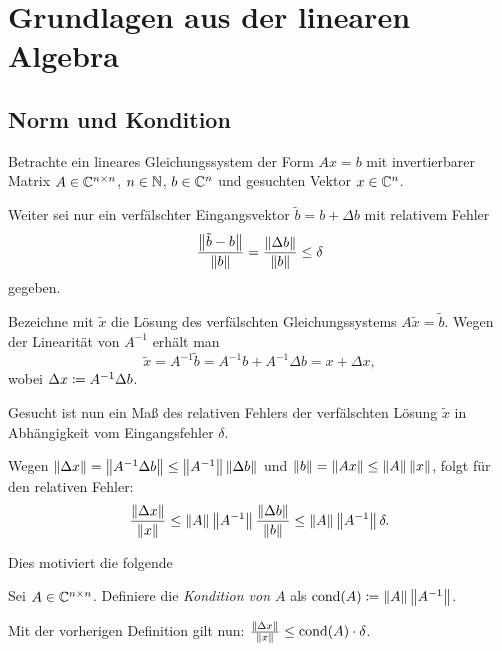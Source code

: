 \chapter{Grundlagen aus der linearen Algebra}
\section{Norm und Kondition}
Betrachte ein lineares Gleichungssystem der Form
$Ax = b$ mit invertierbarer Matrix
$A \in \mathbb{C}^{n \times n}$, $n \in \mathbb{N}$, $b \in \mathbb{C}^n$
und gesuchten Vektor $x \in \mathbb{C}^n$.

Weiter sei nur ein verfälschter Eingangsvektor $\tilde{b} = b + \Delta b$
mit relativem Fehler
\[
    \frac{\left\lVert \tilde{b} - b \right\rVert}{\left\lVert b \right\rVert} = \frac{\left\lVert \Delta b \right\rVert}{\left\lVert b \right\rVert} \leq \delta
\]
gegeben.

Bezeichne mit $\tilde{x}$ die Lösung des verfälschten Gleichungssystems
$A \tilde{x} = \tilde{b}$.
Wegen der Linearität von $A^{-1}$ erhält man
\[
    \tilde{x} = A^{-1} \tilde{b} = A^{-1} b + A^{-1} \Delta b = x + \Delta x,
\]
wobei $\Delta x \coloneqq A^{-1} \Delta b$.

Gesucht ist nun ein Maß des relativen Fehlers der verfälschten Lösung
$\tilde{x}$ in Abhängigkeit vom Eingangsfehler $\delta$.

Wegen $ \left\lVert \Delta x \right\rVert = \left\lVert A^{-1} \Delta b \right\rVert \leq \left\lVert A^{-1} \right\rVert \left\lVert \Delta b \right\rVert $
und $ \left\lVert b \right\rVert = \left\lVert A x \right\rVert \leq \left\lVert A \right\rVert \left\lVert x \right\rVert $,
folgt für den relativen Fehler:
\[
    \frac{\left\lVert \Delta x \right\rVert}{\left\lVert x \right\rVert} \leq \left\lVert A \right\rVert \left\lVert A^{-1} \right\rVert \frac{\left\lVert \Delta b \right\rVert}{\left\lVert b \right\rVert} \leq \left\lVert A \right\rVert \left\lVert A^{-1} \right\rVert \delta.
\]

Dies motiviert die folgende
\begin{mydef}
    Sei $A \in \mathbb{C}^{n \times n}$.
    Definiere die \emph{Kondition von $A$} als $\text{cond$(A)$} \coloneqq \left\lVert A \right\rVert
    \left\lVert A^{-1} \right\rVert$.
\end{mydef}

\begin{remark}
    Mit der vorherigen Definition gilt nun: $ \frac{\left\lVert \Delta x \right\rVert}{\left\lVert x \right\rVert} \leq \text{cond$(A)$} \cdot \delta $.
\end{remark}


